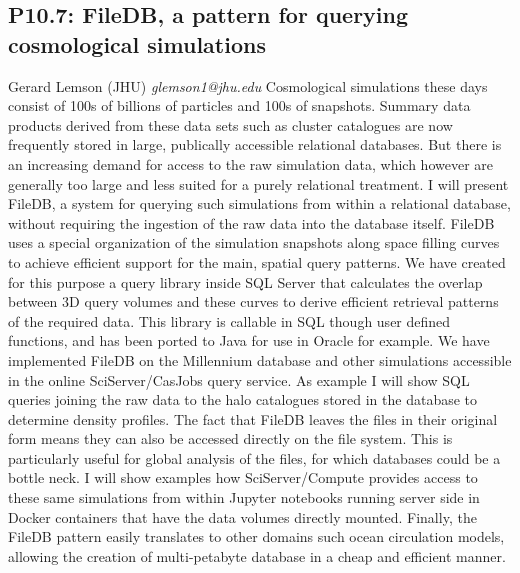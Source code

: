 \documentclass{report}
\begin{document}
\subsection*{P10.7: FileDB, a pattern for querying cosmological simulations}
\bigskip
Gerard Lemson (JHU) \newline   \newline   \newline   \newline  \newline  \newline\newline
{\it glemson1@jhu.edu}\newline
\newline\newline
Cosmological simulations these days consist of 100s of billions of particles and 100s of snapshots. Summary data products derived from these data sets such as cluster catalogues are now frequently stored in large, publically accessible relational databases. But there is an increasing demand for access to the raw simulation data, which however are generally too large and less suited for a purely relational treatment.
I will present FileDB, a system for querying such simulations from within a relational database, without requiring the ingestion of the raw data into the database itself. FileDB uses a special organization of the simulation snapshots along space filling curves to achieve efficient support for the main, spatial query patterns.  We have created for this purpose a query library inside SQL Server that calculates the overlap between 3D query volumes and these curves to derive efficient retrieval patterns of the required data. This library is callable in SQL though user defined functions, and has been ported to Java for use in Oracle for example.
We have implemented FileDB on the Millennium database and other simulations accessible in the online SciServer/CasJobs query service. As example I will show SQL queries joining the raw data to the halo catalogues stored in the database to determine density profiles. 
The fact that FileDB leaves the files in their original form means they can also be accessed directly on the file system. This is particularly useful for global analysis of the files, for which databases could be a bottle neck. I will show examples how SciServer/Compute provides access to these same simulations from within Jupyter notebooks running server side in Docker containers that have the data volumes directly mounted. 
Finally, the FileDB pattern easily translates to other domains such ocean circulation models, allowing the creation of multi-petabyte database in a cheap and efficient manner.\newline
\newpage
\end{document}
